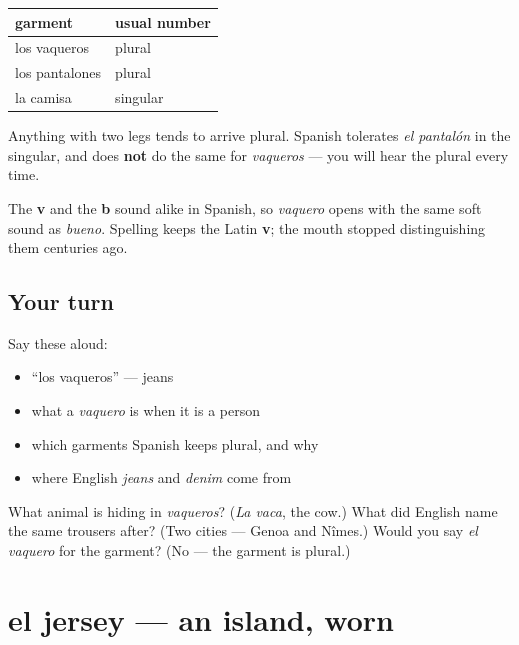 \begin{grammarlens}[title={Grammar Lens: garments that come in pairs}]
\noindent
\begin{tabularx}{\linewidth}{@{}>{\raggedright\arraybackslash}X>{\raggedright\arraybackslash}X@{}}
\toprule
\textbf{garment} & \textbf{usual number} \\
\midrule
los vaqueros & plural \\
los pantalones & plural \\
la camisa & singular \\
\bottomrule
\end{tabularx}

Anything with two legs tends to arrive plural. Spanish tolerates \emph{el pantalón} in the singular, and does \textbf{not} do the same for \emph{vaqueros} — you will hear the plural every time.

The \textbf{v} and the \textbf{b} sound alike in Spanish, so \emph{vaquero} opens with the same soft sound as \emph{bueno}. Spelling keeps the Latin \textbf{v}; the mouth stopped distinguishing them centuries ago.
\end{grammarlens}

\subsection*{Your turn}
Say these aloud:

\begin{itemize}
\raggedright
  \item \textquotedblleft{}los vaqueros\textquotedblright{} — jeans
  \item what a \emph{vaquero} is when it is a person
  \item which garments Spanish keeps plural, and why
  \item where English \emph{jeans} and \emph{denim} come from
\end{itemize}

\begin{tcolorbox}[breakable,colback=teal!4,colframe=teal!35!black,title={Before you move on}]
What animal is hiding in \emph{vaqueros}? (\emph{La vaca}, the cow.) What did English name the same trousers after? (Two cities — Genoa and Nîmes.) Would you say \emph{el vaquero} for the garment? (No — the garment is plural.)
\end{tcolorbox}
\section[el jersey]{el jersey — an island, worn}


